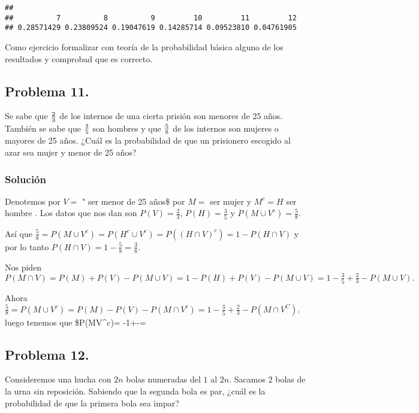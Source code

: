 \documentclass[
]{article}
\begin{document}
\begin{verbatim}
## 
##          7          8          9         10         11         12 
## 0.28571429 0.23809524 0.19047619 0.14285714 0.09523810 0.04761905
\end{verbatim}

Como ejercicio formalizar con teoría de la probabilidad básica alguno de
los resultados y comprobad que es correcto.

\hypertarget{problema-11.}{%
\subsection{Problema 11.}\label{problema-11.}}

Se sabe que \({2 \over 3}\) de los internos de una cierta prisión son
menores de 25 años. También se sabe que \({3\over 5}\) son hombres y que
\({5\over 8}\) de los internos son mujeres o mayores de 25 años. ¿Cuál
es la probabilidad de que un prisionero escogido al azar sea mujer y
menor de 25 años?

\hypertarget{soluciuxf3n-11}{%
\subsubsection{Solución}\label{soluciuxf3n-11}}

Denotemos por \(V=\) " ser menor de 25 años\$ por \(M=\) ser mujer y
\(M^c=H\) ser hombre . Los datos que nos dan son \(P(V)=\frac{2}{3}\),
\(P(H)= \frac{3}{5}\) y \(P(M\cup V^c )=\frac{5}{8}.\)

Así que
\(\frac{5}{8}=P(M\cup V^c)=P(H^c\cup V^c)=P((H\cap V)^c)=1-P(H\cap V)\)
y por lo tanto \(P(H\cap V)=1- \frac{5}{8}=\frac{3}{8}.\)

Nos piden
\(P(M\cap V)=P(M)+P(V)-P(M\cup V)=1-P(H)+P(V)-P(M\cup V)=1-\frac{3}{5}+\frac{2}{3}-P(M\cup V).\)

Ahora
\(\frac{5}{8}=P(M\cup V^c)=P(M)-P(V)-P(M\cap V^c)=1-\frac{3}{5}+\frac{2}{3}-P(M\cap V^C).\)
luego tenemos que \$P(M\cap V\^{}c)=
-1+-=

\hypertarget{problema-12.}{%
\subsection{Problema 12.}\label{problema-12.}}

Consideremos una hucha con \(2n\) bolas numeradas del \(1\) al \(2n\).
Sacamos \(2\) bolas de la urna sin reposición. Sabiendo que la segunda
bola es par, ¿cuál es la probabilidad de que la primera bola sea impar?
\end{document}
